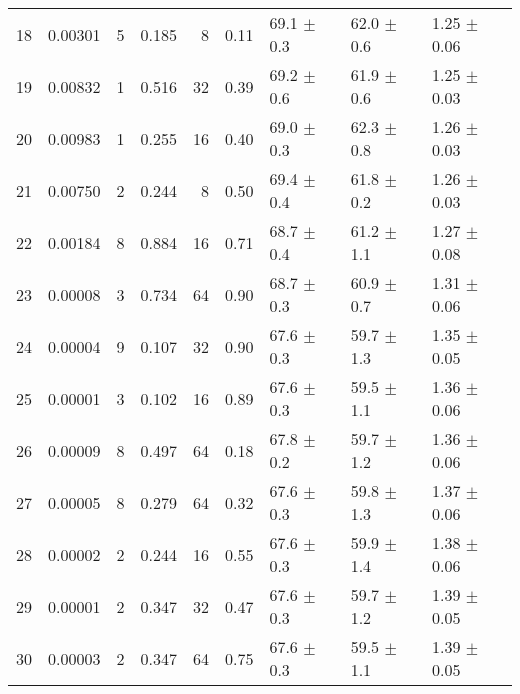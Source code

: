 \begin{table}[h]
\begin{tabular}{rlrlrllll}
18 & 0.00301 & 5 & 0.185 & 8 & 0.11 & 69.1 $\pm$ 0.3 & 62.0 $\pm$ 0.6 & 1.25 $\pm$ 0.06 \\
19 & 0.00832 & 1 & 0.516 & 32 & 0.39 & 69.2 $\pm$ 0.6 & 61.9 $\pm$ 0.6 & 1.25 $\pm$ 0.03 \\
20 & 0.00983 & 1 & 0.255 & 16 & 0.40 & 69.0 $\pm$ 0.3 & 62.3 $\pm$ 0.8 & 1.26 $\pm$ 0.03 \\
21 & 0.00750 & 2 & 0.244 & 8 & 0.50 & 69.4 $\pm$ 0.4 & 61.8 $\pm$ 0.2 & 1.26 $\pm$ 0.03 \\
22 & 0.00184 & 8 & 0.884 & 16 & 0.71 & 68.7 $\pm$ 0.4 & 61.2 $\pm$ 1.1 & 1.27 $\pm$ 0.08 \\
23 & 0.00008 & 3 & 0.734 & 64 & 0.90 & 68.7 $\pm$ 0.3 & 60.9 $\pm$ 0.7 & 1.31 $\pm$ 0.06 \\
24 & 0.00004 & 9 & 0.107 & 32 & 0.90 & 67.6 $\pm$ 0.3 & 59.7 $\pm$ 1.3 & 1.35 $\pm$ 0.05 \\
25 & 0.00001 & 3 & 0.102 & 16 & 0.89 & 67.6 $\pm$ 0.3 & 59.5 $\pm$ 1.1 & 1.36 $\pm$ 0.06 \\
26 & 0.00009 & 8 & 0.497 & 64 & 0.18 & 67.8 $\pm$ 0.2 & 59.7 $\pm$ 1.2 & 1.36 $\pm$ 0.06 \\
27 & 0.00005 & 8 & 0.279 & 64 & 0.32 & 67.6 $\pm$ 0.3 & 59.8 $\pm$ 1.3 & 1.37 $\pm$ 0.06 \\
28 & 0.00002 & 2 & 0.244 & 16 & 0.55 & 67.6 $\pm$ 0.3 & 59.9 $\pm$ 1.4 & 1.38 $\pm$ 0.06 \\
29 & 0.00001 & 2 & 0.347 & 32 & 0.47 & 67.6 $\pm$ 0.3 & 59.7 $\pm$ 1.2 & 1.39 $\pm$ 0.05 \\
30 & 0.00003 & 2 & 0.347 & 64 & 0.75 & 67.6 $\pm$ 0.3 & 59.5 $\pm$ 1.1 & 1.39 $\pm$ 0.05 \\
\bottomrule
\end{tabular}
\end{table}
